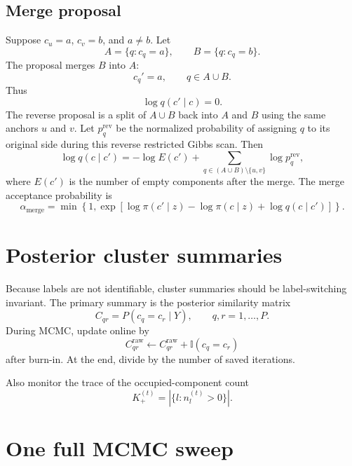 \documentclass[11pt]{article}
\newcommand{\ind}{\mathbb I}
\begin{document}
\subsection{Merge proposal}

Suppose $c_u=a$, $c_v=b$, and $a\neq b$.  Let
\[
    A=\{q:c_q=a\},
    \qquad
    B=\{q:c_q=b\}.
\]
The proposal merges $B$ into $A$:
\[
    c_q'=a,
    \qquad q\in A\cup B.
\]
Thus
\[
    \log q(c'\mid c)=0.
\]
The reverse proposal is a split of $A\cup B$ back into $A$ and $B$ using the
same anchors $u$ and $v$.  Let $p_q^{\mathrm{rev}}$ be the normalized
probability of assigning $q$ to its original side during this reverse
restricted Gibbs scan.  Then
\begin{equation}
    \log q(c\mid c')
    =
    -\log E(c')
    +
    \sum_{q\in(A\cup B)\setminus\{u,v\}}\log p_q^{\mathrm{rev}},
    \label{eq:merge-reverse-probability}
\end{equation}
where $E(c')$ is the number of empty components after the merge.  The merge
acceptance probability is
\begin{equation}
    \alpha_{\mathrm{merge}}
    =
    \min\left\{1,
    \exp\left[
    \log\pi(c'\mid z)-\log\pi(c\mid z)
    +\log q(c\mid c')
    \right]
    \right\}.
    \label{eq:merge-acceptance}
\end{equation}

\section{Posterior cluster summaries}

Because labels are not identifiable, cluster summaries should be
label-switching invariant.  The primary summary is the posterior similarity
matrix
\begin{equation}
    C_{qr}
    =
    P(c_q=c_r\mid Y),
    \qquad q,r=1,\dots,P.
\end{equation}
During MCMC, update online by
\begin{equation}
    C_{qr}^{\mathrm{raw}}
    \leftarrow
    C_{qr}^{\mathrm{raw}}+\ind(c_q=c_r)
\end{equation}
after burn-in.  At the end, divide by the number of saved iterations.

Also monitor the trace of the occupied-component count
\begin{equation}
    K_+^{(t)}=|\{l:n_l^{(t)}>0\}|.
\end{equation}


\section{One full MCMC sweep}
\end{document}
